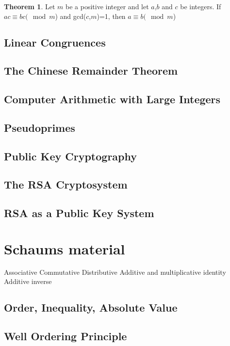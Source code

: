 \documentclass[11pt]{book} %
\theoremstyle {definition}
\newtheorem {theorem}{Theorem}[section]
\theoremstyle {remark}
\begin{document}
\begin{theorem}
Let $m$ be a positive integer and let $a$,$b$ and $c$ be integers. If $ac\equiv bc(\mod m$) and gcd($c$,$m$)=1, then $a\equiv b(\mod m$)
\end{theorem}
  \subsection {Linear Congruences}



  \subsection {The Chinese Remainder Theorem}


  \subsection {Computer Arithmetic with Large Integers}

  \subsection {Pseudoprimes}

  \subsection {Public Key Cryptography}
  \subsection {The RSA Cryptosystem}
  
  \subsection {RSA as a Public Key System}








\section {Schaums material}
Associative
Commutative
Distributive
Additive and multiplicative identity
Additive inverse

\subsection {Order, Inequality, Absolute Value}
\subsection {Well Ordering Principle}
\end{document}
